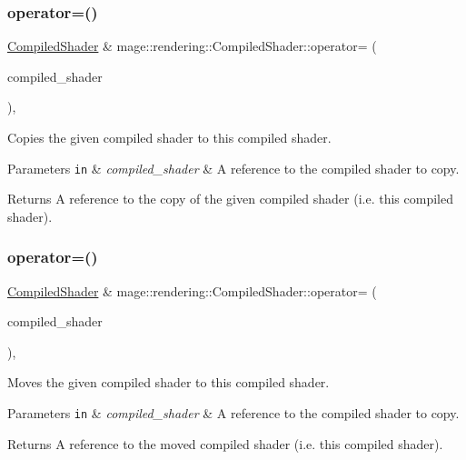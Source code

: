 \subsubsection{\texorpdfstring{operator=()}{operator=()}\hspace{0.1cm}{\footnotesize\ttfamily [1/2]}}
{\footnotesize\ttfamily \mbox{\hyperlink{classmage_1_1rendering_1_1_compiled_shader}{Compiled\+Shader}} \& mage\+::rendering\+::\+Compiled\+Shader\+::operator= (\begin{DoxyParamCaption}\item[{const \mbox{\hyperlink{classmage_1_1rendering_1_1_compiled_shader}{Compiled\+Shader}} \&}]{compiled\+\_\+shader }\end{DoxyParamCaption})\hspace{0.3cm}{\ttfamily [default]}, {\ttfamily [noexcept]}}

Copies the given compiled shader to this compiled shader.


\begin{DoxyParams}[1]{Parameters}
\mbox{\tt in}  & {\em compiled\+\_\+shader} & A reference to the compiled shader to copy. \\
\hline
\end{DoxyParams}
\begin{DoxyReturn}{Returns}
A reference to the copy of the given compiled shader (i.\+e. this compiled shader). 
\end{DoxyReturn}
\mbox{\label{classmage_1_1rendering_1_1_compiled_shader_ab4217b5b68c5cc33b6736a844ddfe699}} 
\subsubsection{\texorpdfstring{operator=()}{operator=()}\hspace{0.1cm}{\footnotesize\ttfamily [2/2]}}
{\footnotesize\ttfamily \mbox{\hyperlink{classmage_1_1rendering_1_1_compiled_shader}{Compiled\+Shader}} \& mage\+::rendering\+::\+Compiled\+Shader\+::operator= (\begin{DoxyParamCaption}\item[{\mbox{\hyperlink{classmage_1_1rendering_1_1_compiled_shader}{Compiled\+Shader}} \&\&}]{compiled\+\_\+shader }\end{DoxyParamCaption})\hspace{0.3cm}{\ttfamily [default]}, {\ttfamily [noexcept]}}

Moves the given compiled shader to this compiled shader.


\begin{DoxyParams}[1]{Parameters}
\mbox{\tt in}  & {\em compiled\+\_\+shader} & A reference to the compiled shader to copy. \\
\hline
\end{DoxyParams}
\begin{DoxyReturn}{Returns}
A reference to the moved compiled shader (i.\+e. this compiled shader). 
\end{DoxyReturn}
